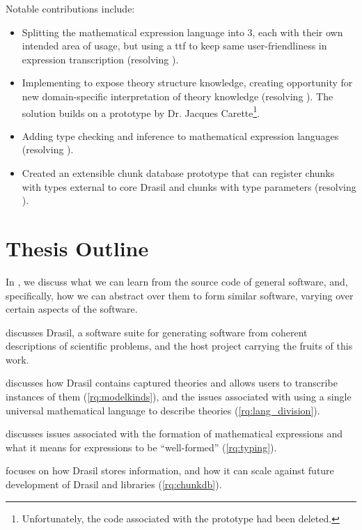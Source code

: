 Notable contributions include:

\begin{itemize}

      \item Splitting the mathematical expression language into 3, each with
            their own intended area of usage, but using a \acs{ttf}
            \cite{Carette2009} to keep same user-friendliness in expression
            transcription (resolving ).

      \item Implementing \ModelKinds{} to expose theory structure knowledge,
            creating opportunity for new domain-specific interpretation of
            theory knowledge (resolving ). The solution
            builds on a prototype by Dr. Jacques Carette\footnote{Unfortunately,
                  the code associated with the prototype had been deleted.}.

      \item Adding type checking and inference to mathematical expression
            languages (resolving ).

      \item Created an extensible chunk database prototype that can register
            chunks with types external to core Drasil and chunks with type
            parameters (resolving ).

\end{itemize}

\section{Thesis Outline}
\label{sec:intro:outline}

In , we discuss what we can learn from the source code of
general software, and, specifically, how we can abstract over them to form
similar software, varying over certain aspects of the software.

 discusses Drasil, a software suite for generating software
from coherent descriptions of scientific problems, and the host project carrying
the fruits of this work.

 discusses how Drasil contains captured theories and
allows users to transcribe instances of them (\ref{rq:modelkinds}), and the
issues associated with using a single universal mathematical language to
describe theories (\ref{rq:lang_division}).

 discusses issues associated with the formation of
mathematical expressions and what it means for expressions to be ``well-formed''
(\ref{rq:typing}).

 focuses on how Drasil stores information, and how it
can scale against future development of Drasil and libraries (\ref{rq:chunkdb}).
